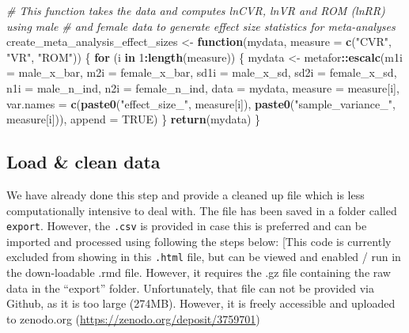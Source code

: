 \documentclass[]{article}
\newenvironment{Shaded}{\begin{snugshade}}{\end{snugshade}}
\newcommand{\CommentTok}[1]{\textcolor[rgb]{0.56,0.35,0.01}{\textit{#1}}}
\newcommand{\ControlFlowTok}[1]{\textcolor[rgb]{0.13,0.29,0.53}{\textbf{#1}}}
\newcommand{\DataTypeTok}[1]{\textcolor[rgb]{0.13,0.29,0.53}{#1}}
\newcommand{\DecValTok}[1]{\textcolor[rgb]{0.00,0.00,0.81}{#1}}
\newcommand{\KeywordTok}[1]{\textcolor[rgb]{0.13,0.29,0.53}{\textbf{#1}}}
\newcommand{\NormalTok}[1]{#1}
\newcommand{\OperatorTok}[1]{\textcolor[rgb]{0.81,0.36,0.00}{\textbf{#1}}}
\newcommand{\OtherTok}[1]{\textcolor[rgb]{0.56,0.35,0.01}{#1}}
\newcommand{\StringTok}[1]{\textcolor[rgb]{0.31,0.60,0.02}{#1}}
\begin{document}
\begin{Shaded}
\begin{Highlighting}[]
\CommentTok{# This function takes the data and computes lnCVR, lnVR and ROM (lnRR) using male}
\CommentTok{# and female data to generate effect size statistics for meta-analyses}
\NormalTok{create_meta_analysis_effect_sizes <-}\StringTok{ }\ControlFlowTok{function}\NormalTok{(mydata, }\DataTypeTok{measure =} \KeywordTok{c}\NormalTok{(}\StringTok{"CVR"}\NormalTok{, }\StringTok{"VR"}\NormalTok{, }\StringTok{"ROM"}\NormalTok{)) \{}
    \ControlFlowTok{for}\NormalTok{ (i }\ControlFlowTok{in} \DecValTok{1}\OperatorTok{:}\KeywordTok{length}\NormalTok{(measure)) \{}
\NormalTok{        mydata <-}\StringTok{ }\NormalTok{metafor}\OperatorTok{::}\KeywordTok{escalc}\NormalTok{(}\DataTypeTok{m1i =}\NormalTok{ male_x_bar, }\DataTypeTok{m2i =}\NormalTok{ female_x_bar, }\DataTypeTok{sd1i =}\NormalTok{ male_x_sd, }
            \DataTypeTok{sd2i =}\NormalTok{ female_x_sd, }\DataTypeTok{n1i =}\NormalTok{ male_n_ind, }\DataTypeTok{n2i =}\NormalTok{ female_n_ind, }\DataTypeTok{data =}\NormalTok{ mydata, }
            \DataTypeTok{measure =}\NormalTok{ measure[i], }\DataTypeTok{var.names =} \KeywordTok{c}\NormalTok{(}\KeywordTok{paste0}\NormalTok{(}\StringTok{"effect_size_"}\NormalTok{, measure[i]), }
                \KeywordTok{paste0}\NormalTok{(}\StringTok{"sample_variance_"}\NormalTok{, measure[i])), }\DataTypeTok{append =} \OtherTok{TRUE}\NormalTok{)}
\NormalTok{    \}}
    \KeywordTok{return}\NormalTok{(mydata)}
\NormalTok{\}}
\end{Highlighting}
\end{Shaded}

\hypertarget{load-clean-data}{%
\subsection{Load \& clean data}\label{load-clean-data}}

We have already done this step and provide a cleaned up file which is
less computationally intensive to deal with. The file has been saved in
a folder called \texttt{export}. However, the \texttt{.csv} is provided
in case this is preferred and can be imported and processed using
following the steps below: {[}This code is currently excluded from
showing in this \texttt{.html} file, but can be viewed and enabled / run
in the down-loadable .rmd file. However, it requires the .gz file
containing the raw data in the ``export'' folder. Unfortunately, that
file can not be provided via Github, as it is too large (274MB).
However, it is freely accessible and uploaded to zenodo.org
(\url{https://zenodo.org/deposit/3759701})
\end{document}
